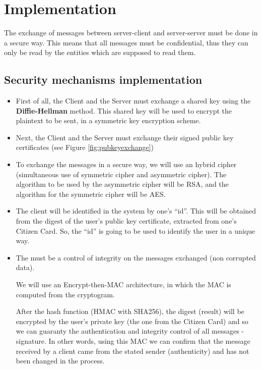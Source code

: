 \newpage
\section{Implementation}

The exchange of messages between server-client and server-server must be done in a secure way. This means that all messages must be confidential, thus they can only be read by the entities which are supposed to read them.

\subsection{Security mechanisms implementation}

\begin{itemize}
    \item First of all, the Client and the Server must exchange a shared key using the \textbf{Diffie-Hellman} method. This shared key will be used to encrypt the plaintext to be sent, in a symmetric key encryption scheme. 
    \item Next, the Client and the Server must exchange their signed public key certificates (see Figure \ref{fig:pubkeyexchange})
    \item To exchange the messages in a secure way, we will use an hybrid cipher (simultaneous use of symmetric cipher and asymmetric cipher). The algorithm to be used by the asymmetric cipher will be RSA, and the algorithm for the symmetric cipher will be AES.
    \item The client will be identified in the system by one’s “id”. This will be obtained from the digest of the user’s public key certificate, extracted from one’s Citizen Card. So, the “id” is going to be used to identify the user in a unique way.
    \item The must be a control of integrity on the messages exchanged (non corrupted data). 
    
    We will use an Encrypt-then-MAC architecture, in which the MAC is computed from the cryptogram. 
    
    After the hash function (HMAC with SHA256), the digest (result) will be encrypted by the user’s private key (the one from the Citizen Card) and so we can guaranty the authentication and integrity control of all messages - signature. In other words, using this MAC we can confirm that the message received by a client came from the stated sender (authenticity) and has not been changed in the process.
\end{itemize}

